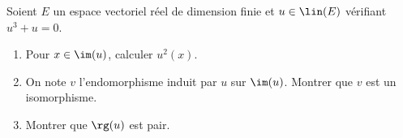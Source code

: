 \begin{enonce}
\begin{exercise}[ID={RMS135 E1412},subtitle={IMT MP 2024},tags={},difficulty={}]
Soient $E$ un espace vectoriel réel de dimension finie et $u \in \lin(E)$ vérifiant $u^3 + u = 0$.
\begin{enumerate}
  \item Pour $x \in \im(u)$, calculer $u^2(x)$.
  \item On note $v$ l’endomorphisme induit par $u$ sur $\im(u)$.
    Montrer que $v$ est un isomorphisme.
  \item Montrer que $\rg(u)$ est pair.
\end{enumerate}
\end{exercise}
\begin{solution}
\end{solution}
\end{enonce}
